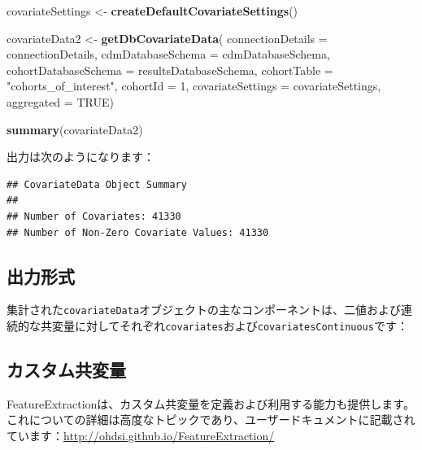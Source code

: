 \documentclass[
  11pt]{book}
\newenvironment{Shaded}{\begin{snugshade}}{\end{snugshade}}
\newcommand{\AttributeTok}[1]{\textcolor[rgb]{0.13,0.29,0.53}{#1}}
\newcommand{\ConstantTok}[1]{\textcolor[rgb]{0.56,0.35,0.01}{#1}}
\newcommand{\DecValTok}[1]{\textcolor[rgb]{0.00,0.00,0.81}{#1}}
\newcommand{\FunctionTok}[1]{\textcolor[rgb]{0.13,0.29,0.53}{\textbf{#1}}}
\newcommand{\NormalTok}[1]{#1}
\newcommand{\OtherTok}[1]{\textcolor[rgb]{0.56,0.35,0.01}{#1}}
\newcommand{\SpecialCharTok}[1]{\textcolor[rgb]{0.81,0.36,0.00}{\textbf{#1}}}
\newcommand{\StringTok}[1]{\textcolor[rgb]{0.31,0.60,0.02}{#1}}
\theoremstyle{definition}
\theoremstyle{definition}
\theoremstyle{definition}
\theoremstyle{definition}
\theoremstyle{remark}
\begin{document}
\begin{Shaded}
\begin{Highlighting}[]
\NormalTok{covariateSettings }\OtherTok{\textless{}{-}} \FunctionTok{createDefaultCovariateSettings}\NormalTok{()}

\NormalTok{covariateData2 }\OtherTok{\textless{}{-}} \FunctionTok{getDbCovariateData}\NormalTok{(}
  \AttributeTok{connectionDetails =}\NormalTok{ connectionDetails,}
  \AttributeTok{cdmDatabaseSchema =}\NormalTok{ cdmDatabaseSchema,}
  \AttributeTok{cohortDatabaseSchema =}\NormalTok{ resultsDatabaseSchema,}
  \AttributeTok{cohortTable =} \StringTok{"cohorts\_of\_interest"}\NormalTok{,}
  \AttributeTok{cohortId =} \DecValTok{1}\NormalTok{,}
  \AttributeTok{covariateSettings =}\NormalTok{ covariateSettings,}
  \AttributeTok{aggregated =} \ConstantTok{TRUE}\NormalTok{)}

\FunctionTok{summary}\NormalTok{(covariateData2)}
\end{Highlighting}
\end{Shaded}

出力は次のようになります：

\begin{verbatim}
## CovariateData Object Summary
##
## Number of Covariates: 41330
## Number of Non-Zero Covariate Values: 41330
\end{verbatim}

\subsection{出力形式}\label{ux51faux529bux5f62ux5f0f}

集計された\texttt{covariateData}オブジェクトの主なコンポーネントは、二値および連続的な共変量に対してそれぞれ\texttt{covariates}および\texttt{covariatesContinuous}です：

\begin{Shaded}
\end{Shaded}

\subsection{カスタム共変量}\label{ux30abux30b9ux30bfux30e0ux5171ux5909ux91cf}

FeatureExtractionは、カスタム共変量を定義および利用する能力も提供します。これについての詳細は高度なトピックであり、ユーザードキュメントに記載されています：\url{http://ohdsi.github.io/FeatureExtraction/}
\end{document}
